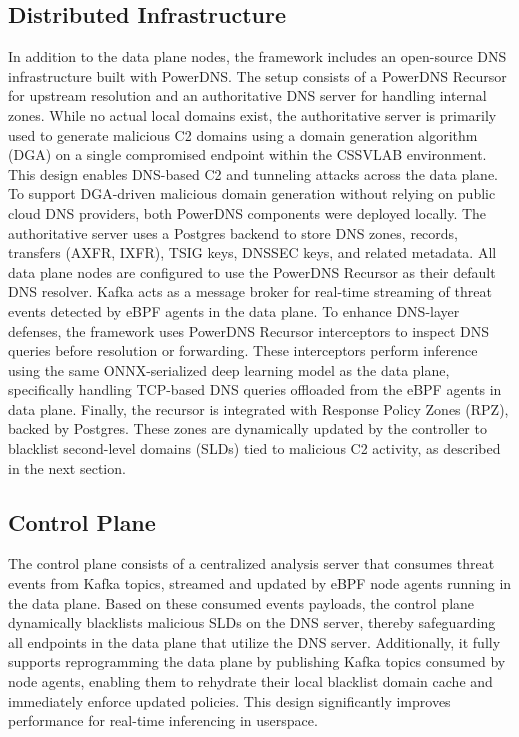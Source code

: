 \documentclass [11pt, proquest] {uwthesis}[2020/02/24]
\begin{document}
\subsection{Distributed Infrastructure}
In addition to the data plane nodes, the framework includes an open-source DNS infrastructure built with PowerDNS. The setup consists of a PowerDNS Recursor for upstream resolution and an authoritative DNS server for handling internal zones. While no actual local domains exist, the authoritative server is primarily used to generate malicious C2 domains using a domain generation algorithm (DGA) on a single compromised endpoint within the CSSVLAB environment. This design enables DNS-based C2 and tunneling attacks across the data plane. To support DGA-driven malicious domain generation without relying on public cloud DNS providers, both PowerDNS components were deployed locally. The authoritative server uses a Postgres backend to store DNS zones, records, transfers (AXFR, IXFR), TSIG keys, DNSSEC keys, and related metadata. All data plane nodes are configured to use the PowerDNS Recursor as their default DNS resolver. Kafka acts as a message broker for real-time streaming of threat events detected by eBPF agents in the data plane. To enhance DNS-layer defenses, the framework uses PowerDNS Recursor interceptors to inspect DNS queries before resolution or forwarding. These interceptors perform inference using the same ONNX-serialized deep learning model as the data plane, specifically handling TCP-based DNS queries offloaded from the eBPF agents in data plane. Finally, the recursor is integrated with Response Policy Zones (RPZ), backed by Postgres. These zones are dynamically updated by the controller to blacklist second-level domains (SLDs) tied to malicious C2 activity, as described in the next section.

\vspace{-1em}
\subsection{Control Plane}
The control plane consists of a centralized analysis server that consumes threat events from Kafka topics, streamed and updated by eBPF node agents running in the data plane. Based on these consumed events payloads, the control plane dynamically blacklists malicious SLDs on the DNS server, thereby safeguarding all endpoints in the data plane that utilize the DNS server. Additionally, it fully supports reprogramming the data plane by publishing Kafka topics consumed by node agents, enabling them to rehydrate their local blacklist domain cache and immediately enforce updated policies. This design significantly improves performance for real-time inferencing in userspace.
\end{document}
